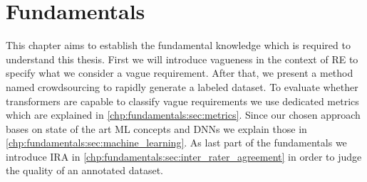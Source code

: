 \chapter{Fundamentals}
\label{chp:fundamentals}

This chapter aims to establish the fundamental knowledge which is required to understand this thesis.
First we will introduce vagueness in the context of \ac{RE} to specify what we consider a vague requirement.
After that, we present a method named crowdsourcing to rapidly generate a labeled dataset.
To evaluate whether transformers are capable to classify vague requirements we use dedicated metrics which are explained in \cref{chp:fundamentals:sec:metrics}.
Since our chosen approach bases on state of the art \ac{ML} concepts and \acp{DNN} we explain those in \cref{chp:fundamentals:sec:machine_learning}.
As last part of the fundamentals we introduce \ac{IRA} in \cref{chp:fundamentals:sec:inter_rater_agreement} in order to judge the quality of an annotated dataset.






